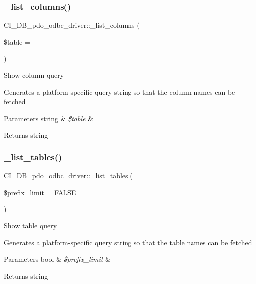 \subsubsection{\texorpdfstring{\+\_\+list\+\_\+columns()}{\_list\_columns()}}
{\footnotesize\ttfamily C\+I\+\_\+\+D\+B\+\_\+pdo\+\_\+odbc\+\_\+driver\+::\+\_\+list\+\_\+columns (\begin{DoxyParamCaption}\item[{}]{\$table = {\ttfamily \textquotesingle{}\textquotesingle{}} }\end{DoxyParamCaption})\hspace{0.3cm}{\ttfamily [protected]}}

Show column query

Generates a platform-\/specific query string so that the column names can be fetched


\begin{DoxyParams}[1]{Parameters}
string & {\em \$table} & \\
\hline
\end{DoxyParams}
\begin{DoxyReturn}{Returns}
string 
\end{DoxyReturn}
\mbox{\label{class_c_i___d_b__pdo__odbc__driver_a28ecbc447e1bb596bd6467d4d7687900}} 
\subsubsection{\texorpdfstring{\+\_\+list\+\_\+tables()}{\_list\_tables()}}
{\footnotesize\ttfamily C\+I\+\_\+\+D\+B\+\_\+pdo\+\_\+odbc\+\_\+driver\+::\+\_\+list\+\_\+tables (\begin{DoxyParamCaption}\item[{}]{\$prefix\+\_\+limit = {\ttfamily FALSE} }\end{DoxyParamCaption})\hspace{0.3cm}{\ttfamily [protected]}}

Show table query

Generates a platform-\/specific query string so that the table names can be fetched


\begin{DoxyParams}[1]{Parameters}
bool & {\em \$prefix\+\_\+limit} & \\
\hline
\end{DoxyParams}
\begin{DoxyReturn}{Returns}
string 
\end{DoxyReturn}
\mbox{\label{class_c_i___d_b__pdo__odbc__driver_a3c1ca0b05e314d55bf1d2d001fb6cb4e}} 

